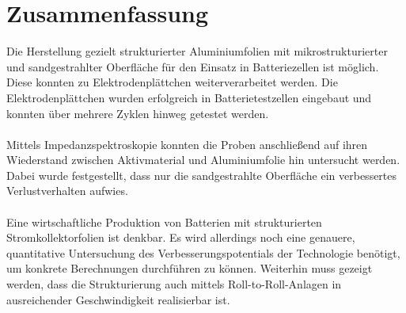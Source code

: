 \documentclass[a4paper, 11pt, headsepline,footsepline,twoside,abstract]{scrbook}
\begin{document}
\section{Zusammenfassung}
Die Herstellung gezielt strukturierter Aluminiumfolien mit mikrostrukturierter und sandgestrahlter Oberfläche für den Einsatz in Batteriezellen ist möglich. Diese konnten zu Elektrodenplättchen weiterverarbeitet werden. Die Elektrodenplättchen wurden erfolgreich in Batterietestzellen eingebaut und konnten über mehrere Zyklen hinweg getestet werden.
\\\\
Mittels Impedanzspektroskopie konnten die Proben anschließend auf ihren Wiederstand zwischen Aktivmaterial und Aluminiumfolie hin untersucht werden. Dabei wurde festgestellt, dass nur die sandgestrahlte Oberfläche ein verbessertes Verlustverhalten aufwies. 
\\\\
Eine wirtschaftliche Produktion von Batterien mit strukturierten Stromkollektorfolien ist denkbar. Es wird allerdings noch eine genauere, quantitative Untersuchung des Verbesserungspotentials der Technologie benötigt, um konkrete Berechnungen durchführen zu können. Weiterhin muss gezeigt werden, dass die Strukturierung auch mittels Roll-to-Roll-Anlagen in ausreichender Geschwindigkeit realisierbar ist.
\end{document}
